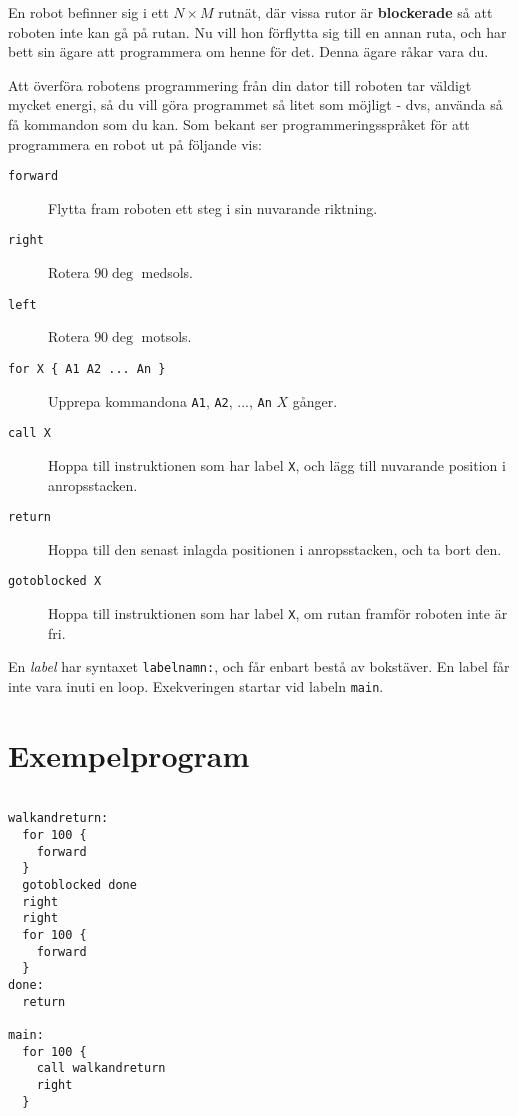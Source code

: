 
En robot befinner sig i ett $N \times M$ rutnät, där vissa rutor är \textbf{blockerade} så att roboten inte kan gå på rutan. Nu vill hon förflytta sig till en annan ruta, och har bett sin ägare att programmera om henne för det. Denna ägare råkar vara du.

Att överföra robotens programmering från din dator till roboten tar väldigt mycket energi, så du vill göra programmet så litet som möjligt - dvs, använda så få kommandon som du kan.
Som bekant ser programmeringsspråket för att programmera en robot ut på följande vis:

\begin{description}
  \item[\texttt{forward}] Flytta fram roboten ett steg i sin nuvarande riktning.
  \item[\texttt{right}] Rotera $90\deg$ medsols.
  \item[\texttt{left}] Rotera $90\deg$ motsols.
  \item[\texttt{for X \{ A1 A2 ... An \}}] Upprepa kommandona \texttt{A1}, \texttt{A2}, ..., \texttt{An} $X$ gånger.
  \item[\texttt{call X}] Hoppa till instruktionen som har label \texttt{X}, och lägg till nuvarande position i anropsstacken.
  \item[\texttt{return}] Hoppa till den senast inlagda positionen i anropsstacken, och ta bort den.
  \item[\texttt{gotoblocked X}] Hoppa till instruktionen som har label \texttt{X}, om rutan framför roboten inte är fri.
\end{description}

En \emph{label} har syntaxet \texttt{labelnamn:}, och får enbart bestå av bokstäver. En label får inte vara inuti en loop. Exekveringen startar vid labeln \texttt{main}.

\section*{Exempelprogram}

\begin{verbatim}

walkandreturn:
  for 100 {
    forward
  }
  gotoblocked done
  right
  right
  for 100 {
    forward
  }
done:
  return

main:
  for 100 {
    call walkandreturn
    right
  }
\end{verbatim}

